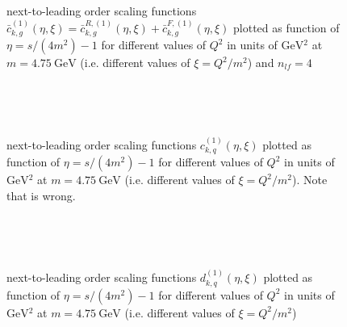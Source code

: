\pagebreak
\begin{figure}[ht!]
\centering
\begin{subfigure}[t]{\textwidth}
	
\end{subfigure}\\%
\begin{subfigure}[t]{\textwidth}
	
\end{subfigure}\\%
\begin{subfigure}[t]{\textwidth}
	
\end{subfigure}
\caption{next-to-leading order scaling functions $\bar c_{k,g}^{(1)}(\eta,\xi) = \bar c_{k,g}^{R,(1)}(\eta,\xi)+\bar c_{k,g}^{F,(1)}(\eta,\xi)$ plotted as function of $\eta=s/(4m^2)-1$ for different values of $Q^2$ in units of $\si{\GeV^2}$ at $m=\SI{4.75}{\GeV}$ (i.e. different values of $\xi=Q^2/m^2$) and $n_{lf}=4$ }\label{fig:cgBar1}
\end{figure}

\pagebreak
\begin{figure}[ht!]
\centering
\begin{subfigure}[t]{\textwidth}
	
\end{subfigure}\\%
\begin{subfigure}[t]{\textwidth}
	
\end{subfigure}\\%
\begin{subfigure}[t]{\textwidth}
	
\end{subfigure}
\caption{next-to-leading order scaling functions $c_{k,q}^{(1)}(\eta,\xi)$ plotted as function of $\eta=s/(4m^2)-1$ for different values of $Q^2$ in units of $\si{\GeV^2}$ at $m=\SI{4.75}{\GeV}$ (i.e. different values of $\xi=Q^2/m^2$). Note that \cite[Fig. 9 (b)]{Laenen1993162} is wrong. }\label{fig:cq1}
\end{figure}

\pagebreak
\begin{figure}[ht!]
\centering
\begin{subfigure}[t]{\textwidth}
	
\end{subfigure}\\%
\begin{subfigure}[t]{\textwidth}
	
\end{subfigure}\\%
\begin{subfigure}[t]{\textwidth}
	
\end{subfigure}
\caption{next-to-leading order scaling functions $d_{k,q}^{(1)}(\eta,\xi)$ plotted as function of $\eta=s/(4m^2)-1$ for different values of $Q^2$ in units of $\si{\GeV^2}$ at $m=\SI{4.75}{\GeV}$ (i.e. different values of $\xi=Q^2/m^2$) }\label{fig:dq1}
\end{figure}

\clearpage
\pagebreak
